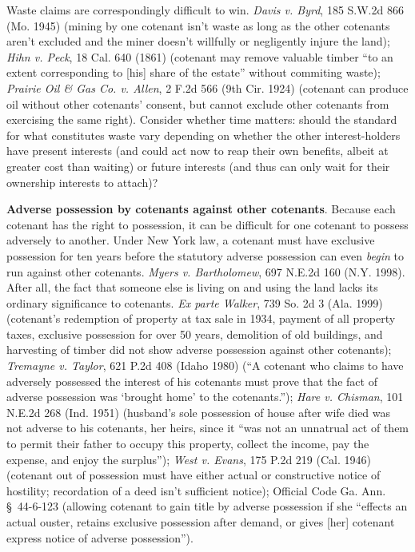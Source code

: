 Waste claims are correspondingly difficult to win. \emph{Davis v. Byrd}, 185
S.W.2d 866 (Mo. 1945) (mining by one cotenant isn't waste as long as the other
cotenants aren't excluded and the miner doesn't willfully or negligently injure
the land); \emph{Hihn v. Peck}, 18 Cal. 640 (1861) (cotenant may remove valuable
timber ``to an extent corresponding to [his] share of the estate'' without
commiting waste); \emph{Prairie Oil \& Gas Co. v. Allen}, 2 F.2d 566 (9th Cir.
1924) (cotenant can produce oil without other cotenants' consent, but cannot
exclude other cotenants from exercising the same right). Consider whether time
matters: should the standard for what constitutes waste vary depending on
whether the other interest-holders have present interests (and could act now to
reap their own benefits, albeit at greater cost than waiting) or future
interests (and thus can only wait for their ownership interests to attach)?

\item \textbf{Adverse possession by cotenants against other cotenants}. Because
each cotenant has the right to possession, it can be difficult for one cotenant
to possess adversely to another. Under New York law, a cotenant must have
exclusive possession for ten years before the statutory adverse possession can
even \textit{begin} to run against other cotenants. \emph{Myers v. Bartholomew},
697 N.E.2d 160 (N.Y. 1998). After all, the fact that someone else is living on
and using the land lacks its ordinary significance to cotenants. \emph{Ex parte
Walker}, 739 So. 2d 3 (Ala. 1999) (cotenant's redemption of property at tax sale
in 1934, payment of all property taxes, exclusive possession for over 50 years,
demolition of old buildings, and harvesting of timber did not show adverse
possession against other cotenants); \emph{Tremayne v. Taylor}, 621 P.2d 408
(Idaho 1980) (``A cotenant who claims to have adversely possessed the interest
of his cotenants must prove that the fact of adverse possession was `brought
home' to the cotenants.''); \emph{Hare v. Chisman}, 101 N.E.2d 268 (Ind. 1951)
(husband's sole possession of house after wife died was not adverse to his
cotenants, her heirs, since it ``was not an unnatrual act of them to permit
their father to occupy this property, collect the income, pay the expense, and
enjoy the surplus''); \emph{West v. Evans}, 175 P.2d 219 (Cal. 1946) (cotenant
out of possession must have either actual or constructive notice of hostility;
recordation of a deed isn't sufficient notice); Official Code Ga. Ann.
\S~44-6-123 (allowing cotenant to gain title by adverse possession if she
``effects an actual ouster, retains exclusive possession after demand, or gives
[her] cotenant express notice of adverse possession'').

